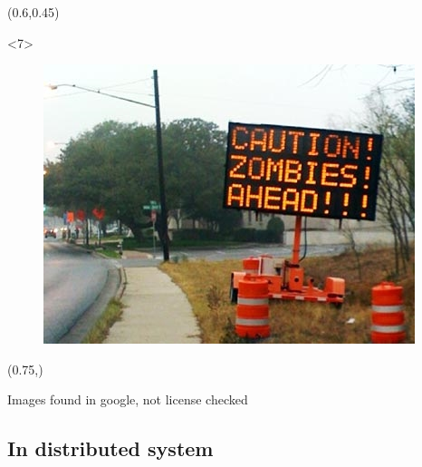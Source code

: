 \documentclass{beamer}
\begin{document}
\begin{frame}
\begin{textblock*}{50mm}
\begin{exampleblock}{}
\begin{figure}
            \end{figure}
        \end{exampleblock}
    \end{textblock*}
    \begin{textblock*}{50mm}(0.6\textwidth,0.45\textheight)
        \begin{exampleblock}{}<7>
            \begin{figure}
                \includegraphics[width=\textwidth]{imgs/aux/zombies-ahead_hack.jpg}
            \end{figure}
        \end{exampleblock}
    \end{textblock*}
    \begin{textblock*}{42mm}(0.75\textwidth,\textheight)
        \begin{alertblock}{}
            \tiny{Images found in google, not license checked}
        \end{alertblock}
    \end{textblock*}
\end{frame}

\subsection{In distributed system}
\end{document}
